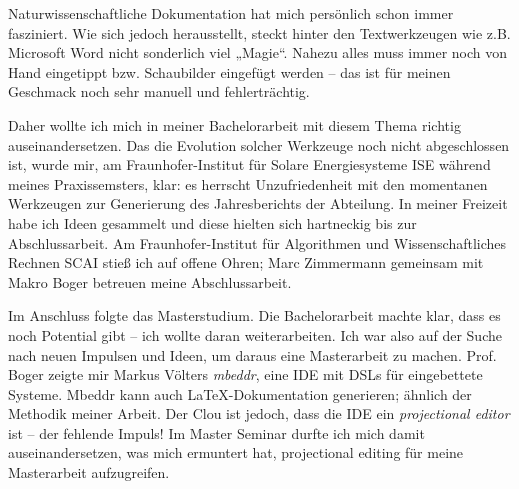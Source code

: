 Naturwissenschaftliche Dokumentation hat mich persönlich schon immer fasziniert.
Wie sich jedoch herausstellt, steckt hinter den Textwerkzeugen wie z.B. Microsoft Word
nicht sonderlich viel „Magie“. Nahezu alles muss immer noch von Hand eingetippt
bzw. Schaubilder eingefügt werden -- das ist für meinen Geschmack noch sehr manuell und fehlerträchtig.

Daher wollte ich mich in meiner Bachelorarbeit \citep{Hodapp} mit diesem Thema
richtig auseinandersetzen.
Das die Evolution solcher Werkzeuge noch nicht abgeschlossen ist, wurde
mir, am Fraunhofer-Institut für Solare Energiesysteme ISE während meines Praxissemsters, klar:
es herrscht Unzufriedenheit mit den momentanen Werkzeugen zur Generierung des Jahresberichts der Abteilung.
In meiner Freizeit habe ich Ideen gesammelt und diese hielten sich hartneckig
bis zur Abschlussarbeit.
Am Fraunhofer-Institut für Algorithmen und Wissenschaftliches Rechnen SCAI stieß ich auf
offene Ohren; Marc Zimmermann gemeinsam mit Makro Boger betreuen meine Abschlussarbeit.

Im Anschluss folgte das Masterstudium. Die Bachelorarbeit machte klar,
dass es noch Potential gibt -- ich wollte daran weiterarbeiten.
Ich war also auf der Suche nach neuen Impulsen und Ideen, um daraus eine Masterarbeit zu machen.
Prof. Boger zeigte mir Markus Völters \emph{mbeddr}, eine IDE mit DSLs für eingebettete Systeme.
Mbeddr kann auch LaTeX-Dokumentation generieren; ähnlich der Methodik meiner Arbeit.
Der Clou ist jedoch, dass die IDE ein \emph{projectional editor} ist --
der fehlende Impuls! Im Master Seminar durfte ich mich damit auseinandersetzen,
was mich ermuntert hat, projectional editing für meine Masterarbeit aufzugreifen.